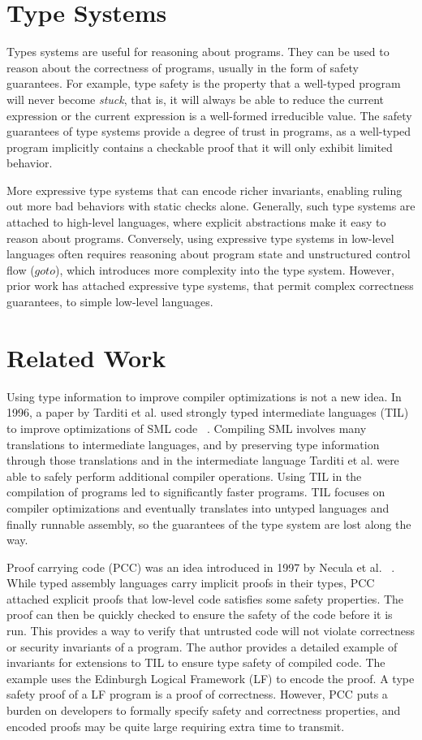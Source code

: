\section{Type Systems}
Types systems are useful for reasoning about programs.
They can be used to reason about the correctness of programs, usually in the form of safety guarantees.
For example, type safety is the property that a well-typed program will never become \emph{stuck}, that is, it will always be able to reduce the current expression or the current expression is a well-formed irreducible value.
The safety guarantees of type systems provide a degree of trust in programs, as a well-typed program implicitly contains a checkable proof that it will only exhibit limited behavior.

More expressive type systems that can encode richer invariants, enabling ruling out more bad behaviors with static checks alone.
Generally, such type systems are attached to high-level languages, where explicit abstractions make it easy to reason about programs.
Conversely, using expressive type systems in low-level languages often requires reasoning about program state and unstructured control flow (\ie $goto$), which introduces more complexity into the type system.
However, prior work has attached expressive type systems, that permit complex correctness guarantees, to simple low-level languages.

\section{Related Work}
\label{sec:relwork}
Using type information to improve compiler optimizations is not a new idea.
In 1996, a paper by Tarditi et al. used strongly typed intermediate languages (TIL) to improve optimizations of SML code ~\cite{TIL}.
Compiling SML involves many translations to intermediate languages, and by preserving type information through those translations and in the intermediate language Tarditi et al. were able to safely perform additional compiler operations.
Using TIL in the compilation of programs led to significantly faster programs.
TIL focuses on compiler optimizations and eventually translates into untyped languages and finally runnable assembly, so the guarantees of the type system are lost along the way.

Proof carrying code (PCC) was an idea introduced in 1997 by Necula et al. ~\cite{PCC}.
While typed assembly languages carry implicit proofs in their types, PCC attached explicit proofs that low-level code satisfies some safety properties.
The proof can then be quickly checked to ensure the safety of the code before it is run.
This provides a way to verify that untrusted code will not violate correctness or security invariants of a program.
The author provides a detailed example of invariants for extensions to TIL to ensure type safety of compiled code.
The example uses the Edinburgh Logical Framework (LF) to encode the proof.
A type safety proof of a LF program is a proof of correctness.
However, PCC puts a burden on developers to formally specify safety and correctness properties, and encoded proofs may be quite large requiring extra time to transmit.

